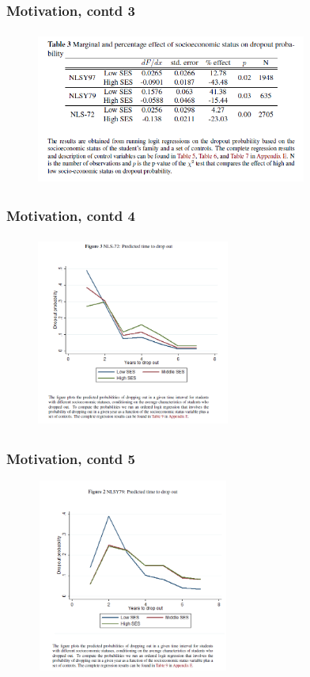 \begin{frame}
	\frametitle{Motivation, contd 3}
		\begin{figure}[H] 
		\caption*{}
		\centering
		\includegraphics[width=3.5in, height=2in]{Figures/OT/table3.png}
		\end{figure}
\end{frame}

\begin{frame}
	\frametitle{Motivation, contd 4}
		\begin{figure}[H] 
		\caption*{}
		\centering
		\includegraphics[width=2.5in, height=2.5in]{Figures/OT/figure3.png}
		\end{figure}
\end{frame}

\begin{frame}
	\frametitle{Motivation, contd 5}
		\begin{figure}[H] 
		\caption*{}
		\centering
		\includegraphics[width=2.5in, height=2.5in]{Figures/OT/figure2.png}
		\end{figure}
\end{frame}

